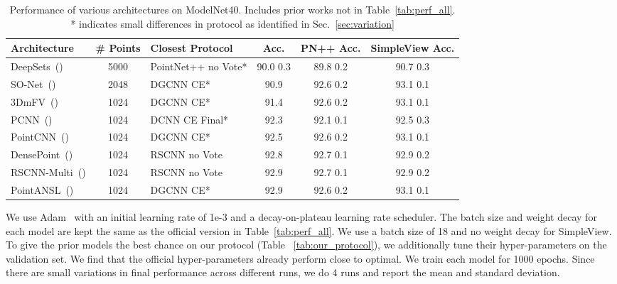 \documentclass{article}
\newcommand\method{SimpleView}
\begin{document}
\begin{table*}[ht]
\caption{Performance of various architectures on ModelNet40. Includes prior works not in Table~\ref{tab:perf_all}. * indicates small differences in protocol as identified in Sec.~\ref{sec:variation}}
\label{tab:one_one}
\centering
\begin{tabular}{lclccc}
\toprule
Architecture & \# Points & Closest Protocol & Acc. & PN++ Acc. & SimpleView Acc. \\ \midrule
DeepSets~(\citeauthor{zaheer-deepsets-nips17})    & 5000    & PointNet++ no Vote* & 90.0  0.3 &  89.8  0.2  & 90.7  0.3      \\
SO-Net~(\citeauthor{li-sonet-cvpr18}) & 2048   & DGCNN CE* & 90.9 & 92.6  0.2  & 93.1  0.1 \\
3DmFV~(\citeauthor{ben20183dmfv})      & 1024  & DGCNN CE*      & 91.4 & 92.6  0.2      & 93.1  0.1 \\
PCNN~(\citeauthor{atzmon2018point})      & 1024  & DCNN CE Final*                & 92.3 &  92.1  0.1  &   92.5  0.3 \\
PointCNN~(\citeauthor{li-pointcnn-ar18})   & 1024   & DGCNN CE*      & 92.5 & 92.6  0.2  & 93.1  0.1 \\
DensePoint~(\citeauthor{liu2019densepoint}) & 1024  & RSCNN no Vote   & 92.8 & 92.7  0.1     & 92.9  0.2\\
RSCNN-Multi~(\citeauthor{liu2019relation})      & 1024  & RSCNN no Vote   & 92.9 & 92.7  0.1      & 92.9  0.2\\
PointANSL~(\citeauthor{yan2020pointasnl}) & 1024  & DGCNN CE*      & 92.9 & 92.6   0.2     & 93.1  0.1 \\
\bottomrule
\end{tabular}
\end{table*}

We use Adam~\citep{kingma2014adam} with an initial learning rate of 1e-3 and a decay-on-plateau learning rate scheduler. The batch size and weight decay for each model are kept the same as the official version in Table~\ref{tab:perf_all}. We use a batch size of 18 and no weight decay for \method{}. To give the prior models the best chance on our protocol (Table ~\ref{tab:our_protocol}), we additionally tune their hyper-parameters on the validation set. We find that the official hyper-parameters already perform close to optimal. We train each model for 1000 epochs. Since there are small variations in final performance across different runs, we do 4 runs and report the mean and standard deviation.
\end{document}
